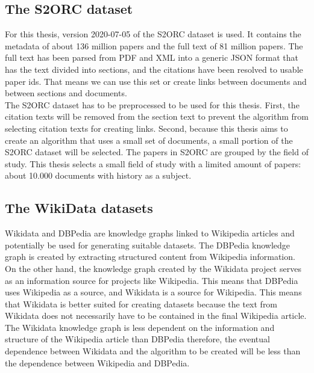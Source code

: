 \subsection{The S2ORC dataset}
\label{secS2orc}
For this thesis, version 2020-07-05 of the S2ORC dataset is used. It contains the metadata of about 136 million papers and the full text of 81 million papers. The full text has been parsed from PDF and XML into a generic JSON format that has the text divided into sections, and the citations have been resolved to usable paper ids. That means we can use this set or create links between documents and between sections and documents.\\

The S2ORC dataset has to be preprocessed to be used for this thesis. First, the citation texts will be removed from the section text to prevent the algorithm from selecting citation texts for creating links. Second, because this thesis aims to create an algorithm that uses a small set of documents, a small portion of the S2ORC dataset will be selected. The papers in S2ORC are grouped by the field of study. This thesis selects a small field of study with a limited amount of papers: about 10.000 documents with history as a subject.\\

\subsection{The WikiData datasets}
\label{sectWikidata}

Wikidata \citet{vrandevcic2014wikidata} and DBPedia \citet{dbpedia} are knowledge graphs linked to Wikipedia articles and potentially be used for generating suitable datasets. The DBPedia knowledge graph is created by extracting structured content from Wikipedia information. On the other hand, the knowledge graph created by the Wikidata project serves as an information source for projects like Wikipedia. This means that DBPedia uses Wikipedia as a source, and Wikidata is a source for Wikipedia. This means that Wikidata is better suited for creating datasets because the text from Wikidata does not necessarily have to be contained in the final Wikipedia article. The Wikidata knowledge graph is less dependent on the information and structure of the Wikipedia article than DBPedia therefore, the eventual dependence between Wikidata and the algorithm to be created will be less than the dependence between Wikipedia and DBPedia.\\

